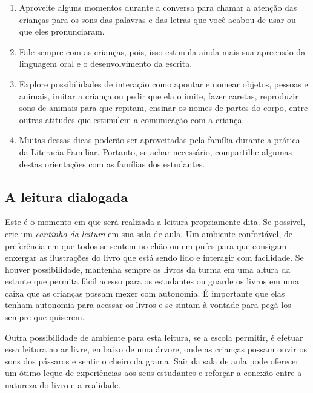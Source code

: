 \documentclass[11pt]{extarticle}
\begin{document}
\begin{enumerate}
\item Aproveite alguns momentos durante a conversa para chamar 
a atenção das crianças para os sons das palavras e das letras que você 
acabou de usar ou que eles pronunciaram.  

\item Fale sempre com as crianças, pois, isso estimula ainda mais sua apreensão da linguagem oral e o desenvolvimento da escrita.

\item Explore possibilidades de interação como apontar e 
nomear objetos, pessoas e animais, imitar a criança ou pedir que 
ela o imite, fazer caretas, reproduzir sons de 
animais para que repitam, ensinar os nomes de partes do corpo, 
entre outras atitudes que estimulem a comunicação com a criança. 

\item Muitas dessas dicas poderão ser aproveitadas pela 
família durante a prática da Literacia Familiar. Portanto, 
se achar necessário, compartilhe algumas destas orientações 
com as famílias dos estudantes.
\end{enumerate}


\subsection{A leitura dialogada}
Este é o momento em que será realizada a leitura propriamente dita. 
Se possível, crie um \textit{cantinho da leitura} em sua sala de aula. Um 
ambiente confortável, de preferência em que todos se sentem no chão ou 
em pufes para que consigam enxergar as ilustrações do livro que está 
sendo lido e interagir com facilidade. Se houver possibilidade, mantenha 
sempre os livros da turma em uma altura da estante que permita fácil 
acesso para os estudantes ou guarde os livros em uma caixa que as crianças 
possam mexer com autonomia. É importante que elas tenham autonomia para 
acessar os livros e se sintam à vontade para pegá-los sempre que quiserem. 


Outra possibilidade de ambiente para esta leitura, se a escola permitir, 
é efetuar essa leitura ao ar livre, embaixo de uma árvore, onde as crianças 
possam ouvir os sons dos pássaros e sentir o cheiro da grama. Sair da sala 
de aula pode oferecer um ótimo leque de experiências aos seus estudantes e 
reforçar a conexão entre a natureza do livro e a realidade.  
\end{document}
